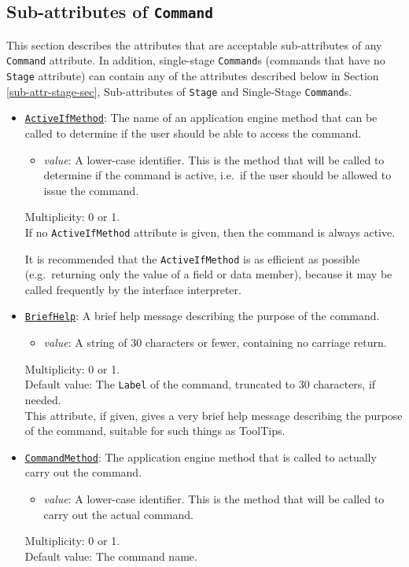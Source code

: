 \documentclass[11pt]{article}
\begin{document}

\subsection{Sub-attributes of {\tt Command}}
\label{sub-attr-command-sec}

This section describes the attributes that are acceptable sub-attributes
of any {\tt Command} attribute.  In addition, single-stage {\tt Command}s
(commands that have no {\tt Stage} attribute) can contain any of the
attributes described below in Section \ref{sub-attr-stage-sec},
Sub-attributes of {\tt Stage} and Single-Stage {\tt Command}s.

\begin{itemize}

\item \underline{\tt ActiveIfMethod}:  The name of an application
engine method that
can be called to determine if the user should be able to access
the command.
\begin{itemize}
\item {\it value}: A lower-case identifier.  This is the method
  that will be called to determine if the command is active, i.e.\ if
  the user should be allowed to issue the command.
\end{itemize}
Multiplicity: 0 or 1. \\
If no {\tt ActiveIfMethod} attribute is given, then the command
is always active.

It is recommended that the {\tt ActiveIfMethod} is as efficient
as possible (e.g.\ returning only the value of a field or data
member), because it may be called frequently by the interface
interpreter.

\item \underline{\tt BriefHelp}:  A brief help message describing
the purpose of the command.
\begin{itemize}
\item {\it value}: A string of 30 characters or fewer, containing
  no carriage return.
\end{itemize}
Multiplicity: 0 or 1. \\
Default value: The {\tt Label} of the command, truncated to 30
characters, if needed. \\
This attribute, if given, gives a very brief help message
describing the purpose of the command, suitable for such things
as ToolTips.

\item \underline{\tt CommandMethod}:  The application engine
method that is called to actually carry out the command.
\begin{itemize}
\item {\it value}: A lower-case identifier.  This is the method
  that will be called to carry out the actual command.
\end{itemize}
Multiplicity: 0 or 1. \\
Default value:  The command name.


\end{itemize}
\end{document}
